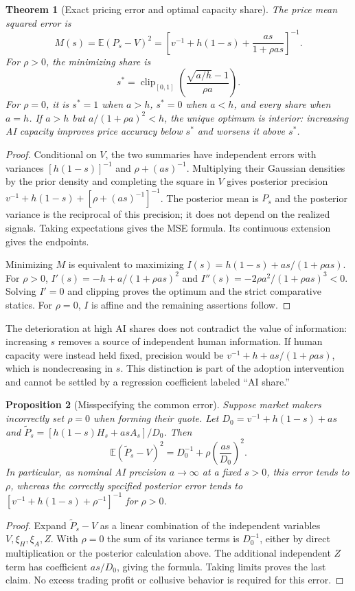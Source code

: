 \documentclass[11pt]{article}
\newtheorem{theorem}{Theorem}
\newtheorem{proposition}[theorem]{Proposition}
\theoremstyle{remark}\newtheorem{remark}[theorem]{Remark}
\newcommand{\E}{\mathbb E}
\newcommand{\clip}{\operatorname{clip}}
\begin{document}
\begin{theorem}[Exact pricing error and optimal capacity share]
The price mean squared error is
\[
 M(s)=\E(P_s-V)^2=
 \left[v^{-1}+h(1-s)+\frac{as}{1+\rho as}\right]^{-1}.
\]
For $\rho>0$, the minimizing share is
\[
 s^*=\clip_{[0,1]}\left(\frac{\sqrt{a/h}-1}{\rho a}\right).
\]
For $\rho=0$, it is $s^*=1$ when $a>h$, $s^*=0$ when $a<h$, and every share when $a=h$. If $a>h$ but $a/(1+\rho a)^2<h$, the unique optimum is interior: increasing AI capacity improves price accuracy below $s^*$ and worsens it above $s^*$.
\end{theorem}
\begin{proof}
Conditional on $V$, the two summaries have independent errors with variances $[h(1-s)]^{-1}$ and $\rho+(as)^{-1}$. Multiplying their Gaussian densities by the prior density and completing the square in $V$ gives posterior precision
$v^{-1}+h(1-s)+[\rho+(as)^{-1}]^{-1}$. The posterior mean is $P_s$ and the posterior variance is the reciprocal of this precision; it does not depend on the realized signals. Taking expectations gives the MSE formula. Its continuous extension gives the endpoints.

Minimizing $M$ is equivalent to maximizing $I(s)=h(1-s)+as/(1+\rho as)$. For $\rho>0$,
$I'(s)=-h+a/(1+\rho as)^2$ and
$I''(s)=-2\rho a^2/(1+\rho as)^3<0$.
Solving $I'=0$ and clipping proves the optimum and the strict comparative statics. For $\rho=0$, $I$ is affine and the remaining assertions follow.
\end{proof}

The deterioration at high AI shares does not contradict the value of information: increasing $s$ removes a source of independent human information. If human capacity were instead held fixed, precision would be $v^{-1}+h+as/(1+\rho as)$, which is nondecreasing in $s$. This distinction is part of the adoption intervention and cannot be settled by a regression coefficient labeled ``AI share.''

\begin{proposition}[Misspecifying the common error]
Suppose market makers incorrectly set $\rho=0$ when forming their quote. Let
$D_0=v^{-1}+h(1-s)+as$ and
$\widetilde P_s=[h(1-s)H_s+as A_s]/D_0$. Then
\[
 \E(\widetilde P_s-V)^2=D_0^{-1}+\rho\left(\frac{as}{D_0}\right)^2.
\]
In particular, as nominal AI precision $a\to\infty$ at a fixed $s>0$, this error tends to $\rho$, whereas the correctly specified posterior error tends to
$[v^{-1}+h(1-s)+\rho^{-1}]^{-1}$ for $\rho>0$.
\end{proposition}
\begin{proof}
Expand $\widetilde P_s-V$ as a linear combination of the independent variables $V,\xi_H,\xi_A,Z$. With $\rho=0$ the sum of its variance terms is $D_0^{-1}$, either by direct multiplication or the posterior calculation above. The additional independent $Z$ term has coefficient $as/D_0$, giving the formula. Taking limits proves the last claim. No excess trading profit or collusive behavior is required for this error.
\end{proof}
\end{document}
